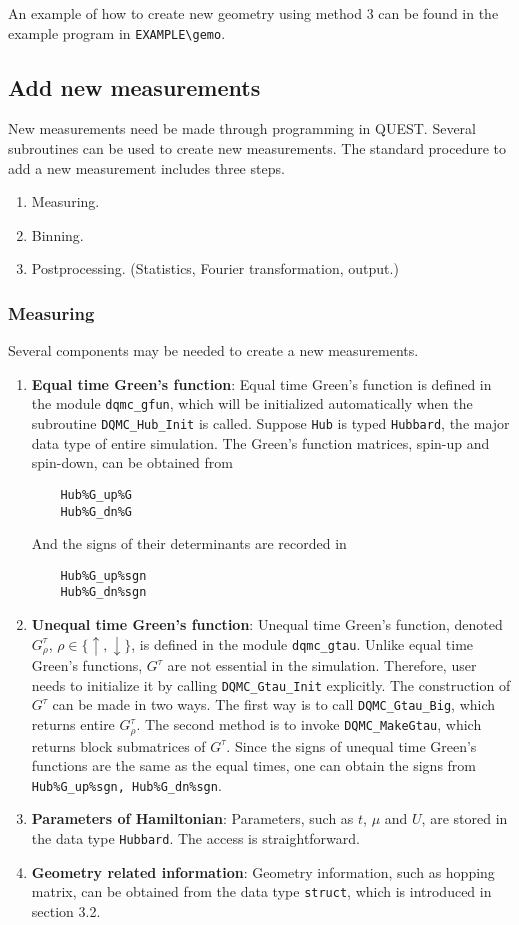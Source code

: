 \documentclass[12pt]{article}
\begin{document}
An example of how to create new geometry using method 3 can be found in the example program in \verb"EXAMPLE\gemo".

\subsection{Add new measurements}
New measurements need be made through programming in QUEST.
Several subroutines can be used to create new measurements.
The standard procedure to add a new measurement includes three steps.
\begin{enumerate}
  \item Measuring.
  \item Binning.
  \item Postprocessing. (Statistics,  Fourier transformation, output.)
\end{enumerate}

\subsubsection{Measuring}
Several components may be needed to create a new measurements.
\begin{enumerate}
  \item {\bf Equal time Green's function}: Equal time Green's function is defined in the module \verb"dqmc_gfun", which will be initialized automatically when the subroutine \verb"DQMC_Hub_Init" is called. Suppose \verb"Hub" is typed \verb"Hubbard", the major data type of entire simulation. The Green's function matrices, spin-up and spin-down, can be obtained from
\begin{verbatim}
    Hub%G_up%G
    Hub%G_dn%G
\end{verbatim}
      And the signs of their determinants are recorded in
\begin{verbatim}
    Hub%G_up%sgn
    Hub%G_dn%sgn
\end{verbatim}
  \item {\bf Unequal time Green's function}: Unequal time Green's function, denoted $G^{\tau}_{\rho}$, $\rho\in\{\uparrow,\downarrow\}$, is defined in the module \verb"dqmc_gtau". Unlike equal time Green's functions, $G^{\tau}$ are not essential in the simulation. Therefore, user needs to initialize it by calling \verb"DQMC_Gtau_Init" explicitly. The construction of $G^{\tau}$ can be made in two ways. The first way is to call \verb"DQMC_Gtau_Big", which returns entire $G^{\tau}_{\rho}$. The second method is to invoke \verb"DQMC_MakeGtau", which returns block submatrices of $G^{\tau}$. Since the signs of unequal time Green's functions are the same as the equal times, one can obtain the signs from \verb"Hub%G_up%sgn, Hub%G_dn%sgn".
  \item {\bf Parameters of Hamiltonian}: Parameters, such as $t$, $\mu$ and $U$, are stored in the data type \verb"Hubbard". The access is straightforward.
  \item {\bf Geometry related information}: Geometry information, such as hopping matrix, can be obtained from the data type \verb"struct", which is introduced in section 3.2.
\end{enumerate}
\end{document}
